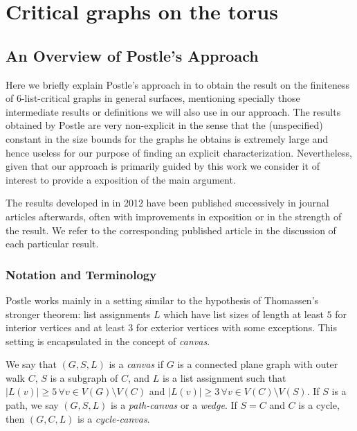 \section{Critical graphs on the torus}


\subsection{An Overview of Postle's Approach}

Here we briefly explain Postle's approach in \cite{postlethesis} to obtain the result on the finiteness of 6-list-critical graphs in general surfaces, mentioning specially those intermediate results or definitions we will also use in our approach. The results obtained by Postle are very non-explicit in the sense that the (unspecified) constant in the size bounds for the graphs he obtains is extremely large and hence useless for our purpose of finding an explicit characterization. Nevertheless, given that our approach is primarily guided by this work we consider it of interest to provide a exposition of the main argument.

The results developed in \cite{postlethesis} in 2012 have been published successively in journal articles afterwards, often with improvements in exposition or in the strength of the result. We refer to the corresponding published article in the discussion of each particular result.

\subsubsection{Notation and Terminology}

Postle works mainly in a setting similar to the hypothesis of Thomassen's stronger theorem: list assignments $L$ which have list sizes of length at least $5$ for interior vertices and at least $3$ for exterior vertices with some exceptions. This setting is encapsulated in the concept of \emph{canvas}.

\begin{definition}[Canvas]
We say that $(G, S, L)$ is a \emph{canvas} if $G$ is a connected plane graph
 with outer walk $C$, $S$ is a subgraph of $C$, and $L$ is a list assignment
  such that $|L(v)| \geq 5 \, \forall v \in V(G) \setminus V(C)$ and
   $|L(v)| \geq 3 \, \forall v \in V(C) \setminus V(S)$. If $S$ is a path,
    we say $(G, S, L)$ is a \emph{path-canvas} or a \emph{wedge}. If $S = C$ and 
    $C$ is a cycle, then $(G, C, L)$ is a \emph{cycle-canvas}.
\end{definition} 



